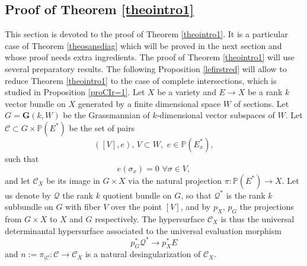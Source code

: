 \documentclass[10pt]{article}
\begin{document}
\subsection{Proof of Theorem \ref{theointro1}}
 This section is devoted to the proof of Theorem \ref{theointro1}. It is a particular case of Theorem \ref{theosansdiag} which will be proved in the next section  and whose proof needs extra ingredients.  The proof of Theorem \ref{theointro1} will use several preparatory results.
The following Proposition
 \ref{lefirstred} will allow to reduce Theorem \ref{theointro1} to the case of complete intersections, which is studied in Proposition \ref{proCIr=1}.
 Let $X$ be a variety and $E\rightarrow X$ be a rank $k$ vector bundle  on $X$ generated by a
 finite dimensional space $W$ of sections. Let $G=\mathbf{G}(k,W)$ be the Grassmannian of $k$-dimensional vector subspaces of $W$. Let $\mathcal{C}\subset G\times \mathbb{P}(E^*)$ be the set
 of pairs
 $$([V],e),\,V\subset W,\,\,e\in \mathbb{P}(E_x^*),$$ such that
 $$e(\sigma_x)=0\,\,\forall \sigma\in V,$$
 and let
 $\mathcal{C}_X$ be its image in $G\times X$ via the natural projection $\pi:\mathbb{P}(E^*)\rightarrow X$. Let us denote by $\mathcal{Q}$ the rank $k$ quotient bundle on $G$, so that $\mathcal{Q}^*$ is the rank $k$ subbundle on $G$ with fiber $V$ over the point $[V]$, and by
$p_X$, $p_G$  the projections from $G\times X$ to $X$ and $G$ respectively. The hypersurface $\mathcal{C}_X$ is thus the universal determinantal
 hypersurface associated to the universal evaluation morphism
 $$p_G^*\mathcal{Q}^*\rightarrow p_X^*E$$
 and $n:=\pi_{\mid \mathcal{C}}:\mathcal{C}\rightarrow \mathcal{C}_X$ is a natural  desingularization of $\mathcal{C}_X$.
\end{document}
